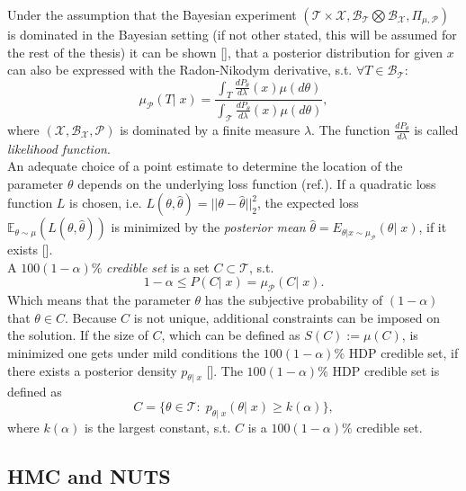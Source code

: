\documentclass[12pt,letterpaper]{article}
\begin{document}
Under the assumption that the Bayesian experiment $(\mathcal{T}\times\mathcal{X},  \mathcal{B}_\mathcal{T}\bigotimes\mathcal{B}_\mathcal{X}, \Pi_{\mu,\mathcal{P}})$ is dominated in the Bayesian setting (if not other stated, this will be assumed for the rest of the thesis) it can be shown [\cite{interbayes}], that a posterior distribution for given $x$ can also be expressed with the Radon-Nikodym derivative, s.t. $\forall T \in \mathcal{B}_\mathcal{T}:$
\begin{equation}
\label{eq:dpost}
 \mu_\mathcal{P}(T|\; x) = \frac{\int_T \frac{dP_\theta}{d\lambda}(x)\mu(d\theta)}{\int_\mathcal{T} \frac{dP_\theta}{d\lambda}(x)\mu(d\theta)},
\end{equation} 
where $(\mathcal{X}, \mathcal{B}_\mathcal{X}, \mathcal{P})$ is dominated by a finite measure $\lambda$. The function $\frac{dP_\theta}{d\lambda}$ is called \textit{likelihood function}. 
\\An adequate choice of a point estimate to determine the location of the parameter $\theta$ depends on the underlying loss function (ref.). If a quadratic loss function $L$ is chosen, i.e. $L(\theta, \hat{\theta}) = ||\theta - \hat{\theta}||_2^2$, the expected loss $\mathbb{E}_{\theta \sim \mu} (L(\theta, \hat{\theta}))$ is minimized by the \textit{posterior mean} $
	\hat{\theta} = E_{\theta |x \sim \mu_\mathcal{P}}(\theta |\; x)$, if it exists [\cite{statdec}]. 
\\ A $100(1-\alpha)\%$ \textit{credible set} is a set $C \subset \mathcal{T}$, s.t.
\begin{equation}
1 - \alpha \leq P(C| \;x ) = \mu_\mathcal{P}(C|\; x).
\end{equation}
Which means that the parameter $\theta$ has the subjective probability of $(1-\alpha)$ that $\theta \in C$.
Because $C$ is not unique, additional constraints can be imposed on the solution. If the size of $C$, which can be defined as  $S(C) := \mu(C)$, is minimized one gets under mild conditions the  $100(1-\alpha)\%$  HDP credible set, if there exists a posterior density $p_{\theta|\;x}$ [\cite{statdec}].
The  $100(1-\alpha)\%$ HDP credible set is defined as  
\begin{equation}
C = \{\theta \in \mathcal{T}: \; p_{\theta|\;x}(\theta|\; x) \geq k(\alpha)\},
\end{equation}
where $k(\alpha)$ is the largest constant, s.t. $C$ is a $100(1-\alpha)\%$ credible set.
\subsection{HMC and NUTS}
\end{document}
